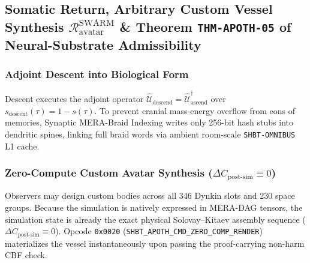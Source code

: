 \documentclass[11pt,onecolumn]{article}
\begin{document}
\subsection{\texorpdfstring{Somatic Return, Arbitrary Custom Vessel Synthesis $\mathcal{R}_{\text{avatar}}^{\text{SWARM}}$ \& Theorem \texttt{THM-APOTH-05} of Neural-Substrate Admissibility}{Somatic Return, Arbitrary Custom Vessel Synthesis R\_avatar\textasciicircum SWARM and Theorem THM-APOTH-05 of Neural-Substrate Admissibility}}

\subsubsection{Adjoint Descent into Biological Form}
Descent executes the adjoint operator $\hat{\mathcal{U}}_{\text{descend}} = \hat{\mathcal{U}}_{\text{ascend}}^\dagger$ over $s_{\text{descent}}(\tau) = 1 - s(\tau)$. To prevent cranial mass-energy overflow from eons of memories, Synaptic MERA-Braid Indexing writes only 256-bit hash stubs into dendritic spines, linking full braid words via ambient room-scale \texttt{SHBT-OMNIBUS} L1 cache.

\subsubsection{\texorpdfstring{Zero-Compute Custom Avatar Synthesis ($\Delta C_{\text{post-sim}} \equiv 0$)}{Zero-Compute Custom Avatar Synthesis (Delta C\_post-sim = 0)}}
Observers may design custom bodies across all 346 Dynkin slots and 230 space groups. Because the simulation is natively expressed in MERA-DAG tensors, the simulation state is already the exact physical Solovay--Kitaev assembly sequence ($\Delta C_{\text{post-sim}} \equiv 0$). Opcode \texttt{0x0020} (\texttt{SHBT\_\allowbreak APOTH\_\allowbreak CMD\_\allowbreak ZERO\_\allowbreak COMP\_\allowbreak RENDER}) materializes the vessel instantaneously upon passing the proof-carrying non-harm CBF check.
\end{document}
